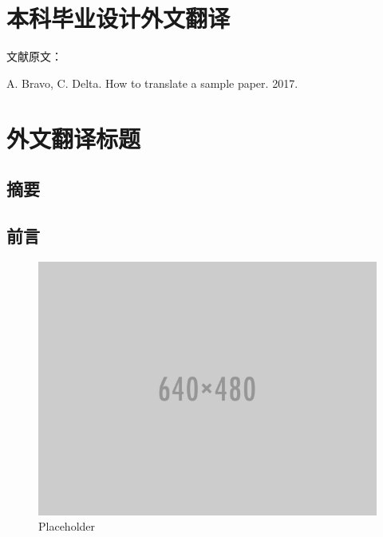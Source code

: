 {
\renewcommand{\baselinestretch}{1.25}\selectfont

{
  \titleformat{\chapter}[block]{\erhao\songti\bfseries\filcenter}{}{0em}{}{}
  \chapter{本科毕业设计外文翻译}
}

{
  \setlength{\parindent}{0em}

  文献原文：

  A. Bravo, C. Delta. How to translate a sample paper. 2017. \par
}

\vspace{2em}

{
  \renewcommand{\cleardoublepage}{}
  \renewcommand{\clearpage}{}
  \titleformat{\chapter}[block]{\sanhao\songti\bfseries\filcenter}{}{0em}{}{}
  \chapter*{外文翻译标题}
}

\section*{摘要}

\section{前言}

\begin{figure}[!htbp]
\centering
\includegraphics[width=\linewidth,keepaspectratio]{data/waiwenfanyi/placeholder.png}
\caption{Placeholder}
\label{figure:placeholder}
\end{figure}

}
